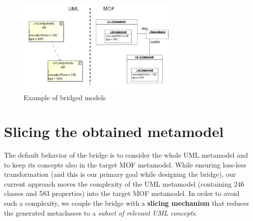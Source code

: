 \begin{figure}[htbp]
	\centering
		\includegraphics[width=0.70\textwidth]{figures/modelingExample.png}
	\caption{Example of bridged models}
	\label{fig:modelingExample}
\end{figure}
%



\section{Slicing the obtained metamodel}\label{sec:slicing}

The default behavior of the bridge is to consider the whole UML metamodel and to keep its concepts also in the
target MOF metamodel. While ensuring loss-less transformation (and this is our primary goal while designing the bridge), our current 
approach moves the complexity of the UML metamodel (containing 246 classes and 583 properties)
into the target MOF metamodel. In order to avoid such a complexity, we couple the bridge with a \textbf{slicing mechanism} that reduces the generated metaclasses to a \textit{subset of relevant UML concepts}.

